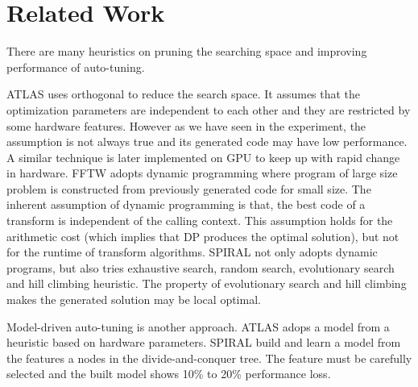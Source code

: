 \section{Related Work}
\label{sec:related}

There are many heuristics on pruning the searching space and improving performance of auto-tuning.

ATLAS\cite{yotov2005search} uses orthogonal to reduce the search space. It assumes that 
the optimization parameters are independent to each other and they are restricted by some hardware features.
However as we have seen in the experiment, the assumption is not always true and its generated code
may have low performance. A similar technique \cite{li2009note} is later implemented on GPU to keep up
with rapid change in hardware. FFTW\cite{frigo2005design} adopts dynamic programming where program of large size problem
is constructed from previously generated code for small size. The inherent assumption of dynamic programming is that,
the best code of a transform is independent of the calling context. This assumption holds for the arithmetic cost (which implies
that DP produces the optimal solution), but not for the runtime of transform algorithms.
SPIRAL\cite{puschel2005spiral} not only adopts dynamic programs,
but also tries exhaustive search, random search, evolutionary search and hill climbing heuristic. The property 
of evolutionary search and hill climbing makes the generated solution may be local optimal. \par

Model-driven auto-tuning is another approach. ATLAS\cite{yotov2005search} adops a model from a heuristic based on
hardware parameters. SPIRAL\cite{puschel2005spiral} build and learn a model from the features a nodes in the divide-and-conquer tree.
The feature must be carefully selected and the built model shows 10\% to 20\% performance loss. \par

